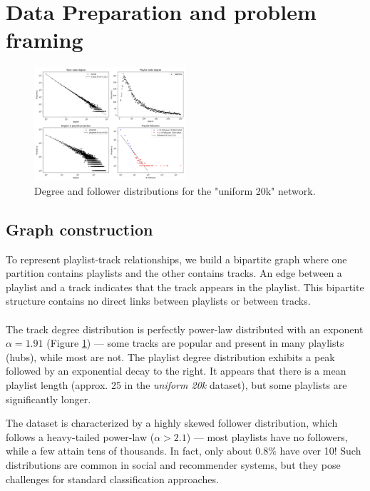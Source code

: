 \documentclass[9pt,twocolumn,twoside]{pnas-report}
\begin{document}
\section{Data Preparation and problem framing}
\label{sec:prep}


\begin{figure}[htbp]
    \centering
    \includegraphics[width=0.5\textwidth]{fig/distributions_uniform_20k.png}
    \caption{Degree and follower distributions for the "uniform 20k" network.}
    \label{fig:dist-u20}
\end{figure}

\subsection{Graph construction}

To represent playlist-track relationships, we build a bipartite graph where one partition contains playlists and the other contains tracks. An edge between a playlist and a track indicates that the track appears in the playlist. This bipartite structure contains no direct links between playlists or between tracks.

\paragraph{}
The track degree distribution is perfectly power-law distributed with an exponent $\alpha = 1.91$ (Figure \ref{fig:dist-u20}) --- some tracks are popular and present in many playlists (hubs), while most are not. 
The playlist degree distribution exhibits a peak followed by an exponential decay to the right. It appears that there is a mean playlist length (approx. 25 in the \textit{uniform 20k} dataset), but some playlists are significantly longer.

The dataset is characterized by a highly skewed follower distribution, which follows a heavy-tailed power-law ($\alpha > 2.1$) --- most playlists have no followers, while a few attain tens of thousands. In fact, only about $0.8\%$ have over 10!
Such distributions are common in social and recommender systems, but they pose challenges for standard classification approaches.
\end{document}
